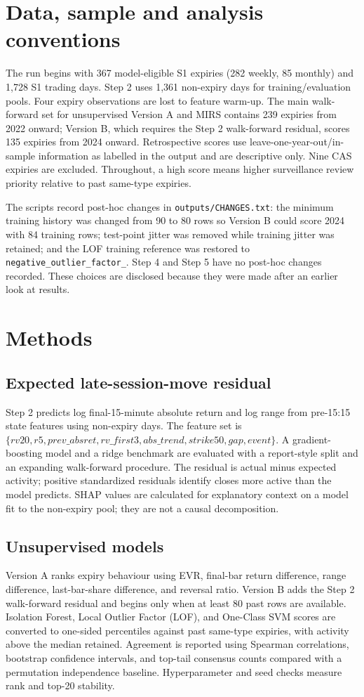 \documentclass[11pt,a4paper]{article}
\begin{document}
\section{Data, sample and analysis conventions}
The run begins with 367 model-eligible S1 expiries (282 weekly, 85 monthly) and 1,728 S1 trading days. Step 2 uses 1,361 non-expiry days for training/evaluation pools. Four expiry observations are lost to feature warm-up. The main walk-forward set for unsupervised Version A and MIRS contains 239 expiries from 2022 onward; Version B, which requires the Step 2 walk-forward residual, scores 135 expiries from 2024 onward. Retrospective scores use leave-one-year-out/in-sample information as labelled in the output and are descriptive only. Nine CAS expiries are excluded. Throughout, a high score means higher surveillance review priority relative to past same-type expiries.

The scripts record post-hoc changes in \texttt{outputs/CHANGES.txt}: the minimum training history was changed from 90 to 80 rows so Version B could score 2024 with 84 training rows; test-point jitter was removed while training jitter was retained; and the LOF training reference was restored to \texttt{negative\_outlier\_factor\_}. Step 4 and Step 5 have no post-hoc changes recorded. These choices are disclosed because they were made after an earlier look at results.

\section{Methods}
\subsection{Expected late-session-move residual}
Step 2 predicts log final-15-minute absolute return and log range from pre-15:15 state features using non-expiry days. The feature set is $\{rv20,r5,prev\_absret,rv\_first3,abs\_trend,strike50,gap,event\}$. A gradient-boosting model and a ridge benchmark are evaluated with a report-style split and an expanding walk-forward procedure. The residual is actual minus expected activity; positive standardized residuals identify closes more active than the model predicts. SHAP values are calculated for explanatory context on a model fit to the non-expiry pool; they are not a causal decomposition.

\subsection{Unsupervised models}
Version A ranks expiry behaviour using EVR, final-bar return difference, range difference, last-bar-share difference, and reversal ratio. Version B adds the Step 2 walk-forward residual and begins only when at least 80 past rows are available. Isolation Forest, Local Outlier Factor (LOF), and One-Class SVM scores are converted to one-sided percentiles against past same-type expiries, with activity above the median retained. Agreement is reported using Spearman correlations, bootstrap confidence intervals, and top-tail consensus counts compared with a permutation independence baseline. Hyperparameter and seed checks measure rank and top-20 stability.
\end{document}
